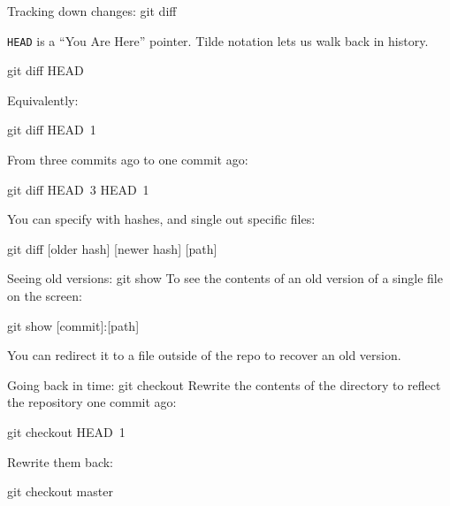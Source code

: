 \begin{frame}[fragile]{Tracking down changes: git diff}

  \texttt{HEAD} is a ``You Are Here'' pointer. Tilde notation lets us
  walk back in history.

  \begin{gitCommand}git diff HEAD~\end{gitCommand}

  Equivalently:

  \begin{gitCommand}git diff HEAD~1\end{gitCommand}

  From three commits ago to one commit ago:

  \begin{gitCommand}git diff HEAD~3 HEAD~1\end{gitCommand}

  You can specify with hashes, and single out specific files:

  \begin{gitCommand}git diff [older hash] [newer hash] [path]\end{gitCommand}


\end{frame}

\begin{frame}[fragile]{Seeing old versions: git show}
  To see the contents of an old version of a single file on the screen:

  \begin{gitCommand}git show [commit]:[path]\end{gitCommand}

  You can redirect it to a file outside of the repo to recover an old version.
\end{frame}

\begin{frame}[fragile]{Going back in time: git checkout}
  Rewrite the contents of the directory to reflect the repository one commit
  ago:

  \begin{gitCommand}git checkout HEAD~1\end{gitCommand}

  Rewrite them back:

  \begin{gitCommand}git checkout master\end{gitCommand}

\end{frame}

